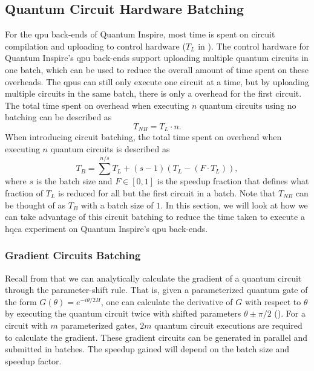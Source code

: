 \subsection{Quantum Circuit Hardware Batching} \label{sec:circuit-batching}
For the \gls{qpu} back-ends of Quantum Inspire, most time is spent on circuit compilation and uploading to control hardware ($T_L$ in ).
The control hardware for Quantum Inspire's \gls{qpu} back-ends support uploading multiple quantum circuits in one batch, which can be used to reduce the overall amount of time spent on these overheads.
The \glspl{qpu} can still only execute one circuit at a time, but by uploading multiple circuits in the same batch, there is only a overhead for the first circuit.
The total time spent on overhead when executing $n$ quantum circuits using no batching can be described as
\begin{equation}
T_{NB} = T_L \cdot n.
\end{equation}
When introducing circuit batching, the total time spent on overhead when executing $n$ quantum circuits is described as
\begin{equation} \label{eqn:batching-analytic}
T_{B} = \sum^{n/s} T_L + (s-1)\left(T_L - \left(F \cdot T_L\right)\right),
\end{equation}
where $s$ is the batch size and $F \in [0, 1]$ is the speedup fraction that defines what fraction of $T_L$ is reduced for all but the first circuit in a batch.
Note that $T_{NB}$ can be thought of as $T_B$ with a batch size of $1$.
In this section, we will look at how we can take advantage of this circuit batching to reduce the time taken to execute a \gls{hqca} experiment on Quantum Inspire's \gls{qpu} back-ends.

\subsubsection{Gradient Circuits Batching}
Recall from  that we can analytically calculate the gradient of a quantum circuit through the parameter-shift rule.
That is, given a parameterized quantum gate of the form $G(\theta) = e^{-i\theta/2 H}$, one can calculate the derivative of $G$ with respect to $\theta$ by executing the quantum circuit twice with shifted parameters $\theta \pm \pi/2$ ().
For a circuit with $m$ parameterized gates, $2m$ quantum circuit executions are required to calculate the gradient.
These gradient circuits can be generated in parallel and submitted in batches.
The speedup gained will depend on the batch size and speedup factor.


